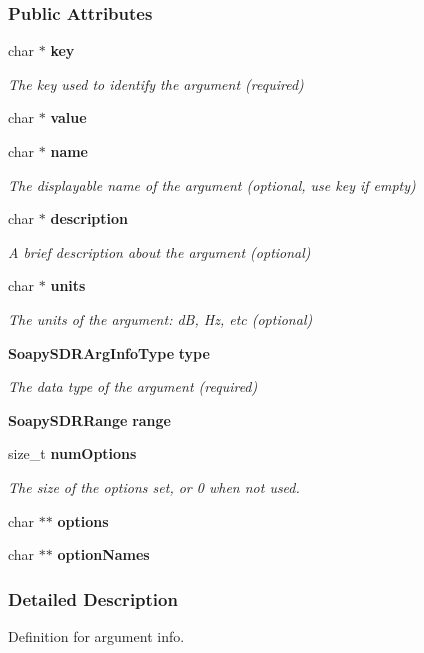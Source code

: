 \subsubsection*{Public Attributes}
\begin{DoxyCompactItemize}
\item 
char $\ast$ {\bf key}
\begin{DoxyCompactList}\small\item\em The key used to identify the argument (required) \end{DoxyCompactList}\item 
char $\ast$ {\bf value}
\item 
char $\ast$ {\bf name}
\begin{DoxyCompactList}\small\item\em The displayable name of the argument (optional, use key if empty) \end{DoxyCompactList}\item 
char $\ast$ {\bf description}
\begin{DoxyCompactList}\small\item\em A brief description about the argument (optional) \end{DoxyCompactList}\item 
char $\ast$ {\bf units}
\begin{DoxyCompactList}\small\item\em The units of the argument\+: dB, Hz, etc (optional) \end{DoxyCompactList}\item 
{\bf Soapy\+S\+D\+R\+Arg\+Info\+Type} {\bf type}
\begin{DoxyCompactList}\small\item\em The data type of the argument (required) \end{DoxyCompactList}\item 
{\bf Soapy\+S\+D\+R\+Range} {\bf range}
\item 
size\+\_\+t {\bf num\+Options}
\begin{DoxyCompactList}\small\item\em The size of the options set, or 0 when not used. \end{DoxyCompactList}\item 
char $\ast$$\ast$ {\bf options}
\item 
char $\ast$$\ast$ {\bf option\+Names}
\end{DoxyCompactItemize}


\subsubsection{Detailed Description}
Definition for argument info. 

